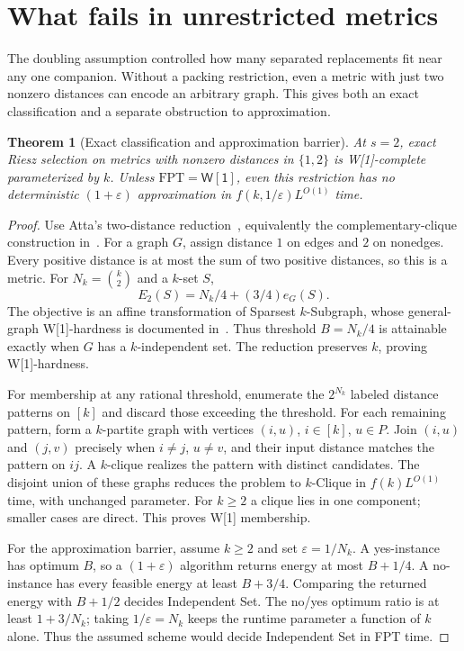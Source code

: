 \documentclass[a4paper,12pt]{article}
\newtheorem{theorem}{Theorem}[section]
\numberwithin{equation}{section}
\begin{document}
\section{What fails in unrestricted metrics}\label{sec:metric-barrier}
The doubling assumption controlled how many separated replacements fit near any
one companion. Without a packing restriction, even a metric with just two
nonzero distances can encode an arbitrary graph. This gives both an exact
classification and a separate obstruction to approximation.
\begin{theorem}[Exact classification and approximation barrier]\label{thm:metric-barrier}
At $s=2$, exact Riesz selection on metrics with nonzero distances in $\{1,2\}$ is W[1]-complete
parameterized by $k$. Unless $\mathrm{FPT}=\mathsf{W[1]}$, even this restriction has no
deterministic $(1+\varepsilon)$ approximation in $f(k,1/\varepsilon)L^{O(1)}$ time.
\end{theorem}
\begin{proof}
Use Atta's two-distance reduction~\cite[Section 5]{atta2026}, equivalently the
complementary-clique construction in~\cite[Theorem 1]{metric2026}. For a graph $G$, assign
distance $1$ on edges and $2$ on nonedges. Every positive distance is at most the sum of two
positive distances, so this is a metric. For $N_k=\binom{k}{2}$ and a $k$-set $S$,
\begin{equation}\label{eq:metric-gap}
 E_2(S)=N_k/4+(3/4)e_G(S).
\end{equation}
The objective is an affine transformation of Sparsest $k$-Subgraph, whose general-graph
W[1]-hardness is documented in~\cite{bougeret2014}. Thus threshold $B=N_k/4$ is attainable exactly
when $G$ has a $k$-independent set. The reduction preserves $k$, proving W[1]-hardness.

For membership at any rational threshold, enumerate the $2^{N_k}$ labeled distance patterns on
$[k]$ and discard those exceeding the threshold. For each remaining pattern, form a $k$-partite
graph with vertices $(i,u)$, $i\in[k]$, $u\in P$. Join $(i,u)$ and $(j,v)$ precisely when $i\ne
j$, $u\ne v$, and their input distance matches the pattern on $ij$. A $k$-clique realizes the
pattern with distinct candidates. The disjoint union of these graphs reduces the problem to
$k$-Clique in $f(k)L^{O(1)}$ time, with unchanged parameter. For $k\ge2$ a clique lies in one
component; smaller cases are direct. This proves W[1] membership.

For the approximation barrier, assume $k\ge2$ and set $\varepsilon=1/N_k$. A yes-instance has
optimum $B$, so a $(1+\varepsilon)$ algorithm returns energy at most $B+1/4$. A no-instance has
every feasible energy at least $B+3/4$. Comparing the returned energy with $B+1/2$ decides
Independent Set. The no/yes optimum ratio is at least $1+3/N_k$; taking
$1/\varepsilon=N_k$ keeps the runtime parameter a function of $k$ alone. Thus the assumed
scheme would decide Independent Set in FPT time.
\end{proof}
\end{document}
